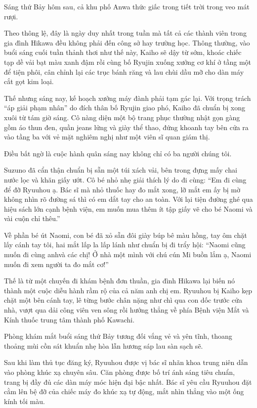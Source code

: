 ﻿\documentclass[../main.tex]{subfiles}
\begin{document}

Sáng thứ Bảy hôm sau, cả khu phố Anwa thức giấc trong tiết trời trong veo mát rượi.

Theo thông lệ, đây là ngày duy nhất trong tuần mà tất cả các thành viên trong gia đình Hikawa đều không phải đến công sở hay trường học. Thông thường, vào buổi sáng cuối tuần thảnh thơi như thế này, Kaiho sẽ dậy từ sớm, khoác chiếc tạp dề vải bạt màu xanh đậm rồi cùng bố Ryujin xuống xưởng cơ khí ở tầng một để tiện phôi, cân chỉnh lại các trục bánh răng và lau chùi dầu mỡ cho dàn máy cắt gọt kim loại.

Thế nhưng sáng nay, kế hoạch xưởng máy đành phải tạm gác lại. Với trọng trách ``áp giải phạm nhân'' do đích thân bố Ryujin giao phó, Kaiho đã chuẩn bị xong xuôi từ tám giờ sáng. Cô nàng diện một bộ trang phục thường nhật gọn gàng gồm áo thun đen, quần jeans lửng và giày thể thao, đứng khoanh tay bên cửa ra vào tầng ba với vẻ mặt nghiêm nghị như một viên sĩ quan giám thị.

Điều bất ngờ là cuộc hành quân sáng nay không chỉ có ba người chúng tôi.

Suzuno đã cẩn thận chuẩn bị sẵn một túi xách vải, bên trong đựng mấy chai nước lọc và khăn giấy ướt. Cô bé nhỏ nhẹ giải thích lý do đi cùng: ``Em đi cùng để đỡ Ryuuhou ạ. Bác sĩ mà nhỏ thuốc hay đo mắt xong, lỡ mắt em ấy bị mờ không nhìn rõ đường sá thì có em dắt tay cho an toàn. Với lại tiện đường ghé qua hiệu sách lớn cạnh bệnh viện, em muốn mua thêm ít tập giấy vẽ cho bé Naomi và vài cuộn chỉ thêu.''

Về phần bé út Naomi, con bé đã xỏ sẵn đôi giày búp bê màu hồng, tay ôm chặt lấy cánh tay tôi, hai mắt lấp la lấp lánh như chuẩn bị đi trẩy hội: ``Naomi cũng muốn đi cùng anhvà các chị! Ở nhà một mình với chú cún Mi buồn lắm ạ, Naomi muốn đi xem người ta đo mắt cơ!''

Thế là từ một chuyến đi khám bệnh đơn thuần, gia đình Hikawa lại biến nó thành một cuộc diễu hành rầm rộ của cả năm anh chị em. Ryuuhou bị Kaiho kẹp chặt một bên cánh tay, lê từng bước chân nặng như chì qua con dốc trước cửa nhà, vượt qua dải công viên ven sông rồi hướng thẳng về phía Bệnh viện Mắt và Kính thuốc trung tâm thành phố Kawachi.

\ct

Phòng khám mắt buổi sáng thứ Bảy tương đối vắng vẻ và yên tĩnh, thoang thoảng mùi cồn sát khuẩn nhẹ hòa lẫn hương sáp lau sàn sạch sẽ.

Sau khi làm thủ tục đăng ký, Ryuuhou được vị bác sĩ nhãn khoa trung niên dẫn vào phòng khúc xạ chuyên sâu. Căn phòng được bố trí ánh sáng tiêu chuẩn, trang bị đầy đủ các dàn máy móc hiện đại bậc nhất. Bác sĩ yêu cầu Ryuuhou đặt cằm lên bệ đỡ của chiếc máy đo khúc xạ tự động, mắt nhìn thẳng vào một ống kính tối màu.
\end{document}
